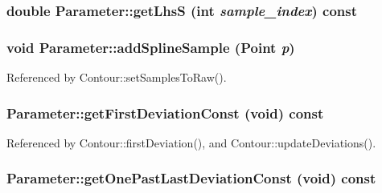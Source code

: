 \hypertarget{classParameter_b918e85afbde855a65c0b82cb3484308}{
\subsubsection[getLhsS]{\setlength{\rightskip}{0pt plus 5cm}double Parameter::getLhsS (int {\em sample\_\-index}) const}}
\label{classParameter_b918e85afbde855a65c0b82cb3484308}


\hypertarget{classParameter_52053a1e39332eab88503c5328343d7f}{
\subsubsection[addSplineSample]{\setlength{\rightskip}{0pt plus 5cm}void Parameter::addSplineSample ({\bf Point} {\em p})}}
\label{classParameter_52053a1e39332eab88503c5328343d7f}




Referenced by Contour::setSamplesToRaw().\hypertarget{classParameter_69d4f2f72a57ac999196a1b7d3417286}{
\subsubsection[getFirstDeviationConst]{ Parameter::getFirstDeviationConst (void) const}}
\label{classParameter_69d4f2f72a57ac999196a1b7d3417286}




Referenced by Contour::firstDeviation(), and Contour::updateDeviations().\hypertarget{classParameter_fc243c9ebaef7c8711859696d8c5a1a4}{
\subsubsection[getOnePastLastDeviationConst]{ Parameter::getOnePastLastDeviationConst (void) const}}
\label{classParameter_fc243c9ebaef7c8711859696d8c5a1a4}




